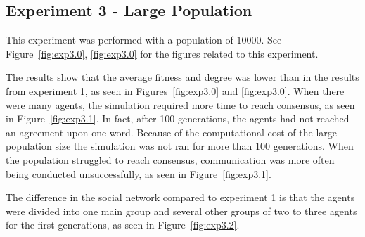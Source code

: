 \clearpage
\subsection{Experiment 3 - Large Population}
This experiment was performed with a population of $10000$. See Figure~\ref{fig:exp3.0}, \ref{fig:exp3.0} for the figures related to this experiment. 

The results show that the average fitness and degree was lower than in the results from experiment 1, as seen in Figures~\ref{fig:exp3.0} and \ref{fig:exp3.0}. When there were many agents, the simulation required more time to reach consensus, as seen in Figure~\ref{fig:exp3.1}. In fact, after 100 generations, the agents had not reached an agreement upon one word. Because of the computational cost of the large population size the simulation was not ran for more than 100 generations. When the population struggled to reach consensus, communication was more often being conducted unsuccessfully, as seen in Figure~\ref{fig:exp3.1}.  

The difference in the social network compared to experiment 1 is that the agents were divided into one main group and several other groups of two to three agents for the first generations, as seen in Figure~\ref{fig:exp3.2}.

